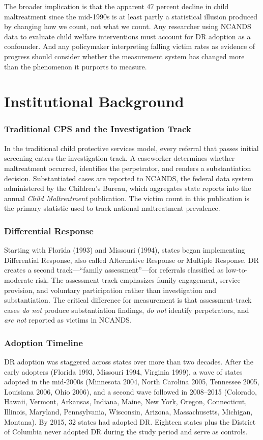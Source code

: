 \documentclass[12pt]{article}
\begin{document}
The broader implication is that the apparent 47 percent decline in child maltreatment since the mid-1990s is at least partly a statistical illusion produced by changing how we count, not what we count. Any researcher using NCANDS data to evaluate child welfare interventions must account for DR adoption as a confounder. And any policymaker interpreting falling victim rates as evidence of progress should consider whether the measurement system has changed more than the phenomenon it purports to measure.

\section{Institutional Background}

\subsubsection*{Traditional CPS and the Investigation Track} In the traditional child protective services model, every referral that passes initial screening enters the investigation track. A caseworker determines whether maltreatment occurred, identifies the perpetrator, and renders a substantiation decision. Substantiated cases are reported to NCANDS, the federal data system administered by the Children's Bureau, which aggregates state reports into the annual \textit{Child Maltreatment} publication. The victim count in this publication is the primary statistic used to track national maltreatment prevalence.

\subsubsection*{Differential Response} Starting with Florida (1993) and Missouri (1994), states began implementing Differential Response, also called Alternative Response or Multiple Response. DR creates a second track---``family assessment''---for referrals classified as low-to-moderate risk. The assessment track emphasizes family engagement, service provision, and voluntary participation rather than investigation and substantiation. The critical difference for measurement is that assessment-track cases \textit{do not} produce substantiation findings, \textit{do not} identify perpetrators, and \textit{are not} reported as victims in NCANDS.

\subsubsection*{Adoption Timeline} DR adoption was staggered across states over more than two decades. After the early adopters (Florida 1993, Missouri 1994, Virginia 1999), a wave of states adopted in the mid-2000s (Minnesota 2004, North Carolina 2005, Tennessee 2005, Louisiana 2006, Ohio 2006), and a second wave followed in 2008--2015 (Colorado, Hawaii, Vermont, Arkansas, Indiana, Maine, New York, Oregon, Connecticut, Illinois, Maryland, Pennsylvania, Wisconsin, Arizona, Massachusetts, Michigan, Montana). By 2015, 32 states had adopted DR. Eighteen states plus the District of Columbia never adopted DR during the study period and serve as controls.
\end{document}
